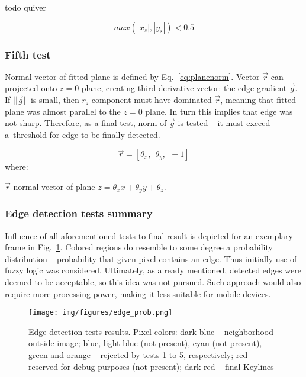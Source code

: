 todo quiver

\begin{equation}
max(|x_s|, |y_s|) < 0.5
\label{eq:subpix_inside}
\end{equation}

\subsubsection{Fifth test}
\label{edge_fith}

Normal vector of fitted plane is defined by Eq.~\ref{eq:planenorm}. Vector $\vec{r}$ can projected onto $z=0$ plane, creating third derivative vector: the edge gradient $\vec{g}$. If $||\vec{g}||$ is small, then $r_{z}$ component must have dominated $\vec{r}$, meaning that fitted plane was almost parallel to the $z=0$ plane. In turn this implies that edge was not sharp. Therefore, as a final test, norm of $\vec{g}$ is tested -- it must exceed a~threshold for edge to be finally detected.

\begin{equation}
\vec{r} = [\theta_{x},\ \ \theta_{y},\ \ -1]
\label{eq:planenorm}
\end{equation}
where:
\begin{eqwhere}[2cm]
	\item[$\vec{r}$] normal vector of plane $z = \theta_{x}x + \theta_{y}y + \theta_{z}$.
\end{eqwhere}

\subsubsection{Edge detection tests summary}

Influence of all aforementioned tests to final result is depicted for an exemplary frame in Fig.~\ref{fig:edgeprob}. Colored regions do resemble to some degree a probability distribution -- probability that given pixel contains an edge. Thus initially use of fuzzy logic was considered. Ultimately, as already mentioned, detected edges were deemed to be acceptable, so this idea was not pursued. Such approach would also require more processing power, making it less suitable for mobile devices.

\begin{figure}[ht]
	\centering\texttt{[image: img/figures/edge\_prob.png]}
	\caption{ Edge detection tests results. Pixel colors: dark blue -- neighborhood outside image; blue, light blue (not present), cyan (not present), green and orange -- rejected by tests 1 to 5, respectively; red -- reserved for debug purposes (not present); dark red -- final Keylines}
	\label{fig:edgeprob}
\end{figure}

